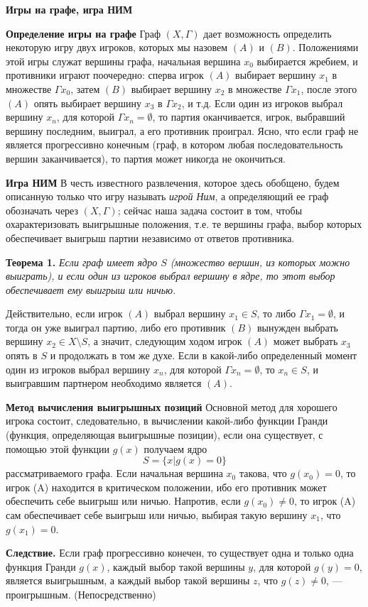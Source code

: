 \textbf{Игры на графе, игра НИМ}

\textbf{Определение игры на графе}
Граф $(X, \Gamma)$ дает возможность определить некоторую игру двух игроков, которых мы назовем $(A)$ и $(B)$. Положениями этой игры служат вершины графа, начальная вершина $x_0$ выбирается жребием, и противники играют поочередно: сперва игрок $(A)$ выбирает вершину $x_1$ в множестве $\Gamma x_0$, затем $(B)$ выбирает вершину $x_2$ в множестве $\Gamma x_1$, после этого $(A)$ опять выбирает вершину $x_3$ в $\Gamma x_2$, и т.д. Если один из игроков выбрал вершину $x_n$, для которой $\Gamma x_n = \emptyset$, то партия оканчивается, игрок, выбравший вершину последним, выиграл, а его противник проиграл. Ясно, что если граф не является прогрессивно конечным (граф, в котором любая последовательность вершин заканчивается), то партия может никогда не окончиться.

\textbf{Игра НИМ}
В честь известного развлечения, которое здесь обобщено, будем описанную только что игру называть \textit{игрой Ним}, а определяющий ее граф обозначать через $(X, \Gamma)$; сейчас наша задача состоит в том, чтобы охарактеризовать выигрышные положения, т.е. те вершины графа, выбор которых обеспечивает выигрыш партии независимо от ответов противника.

\textbf{Теорема 1.} \textit{Если граф имеет ядро $S$ (множество вершин, из которых можно выиграть), и если один из игроков выбрал вершину в ядре, то этот выбор обеспечивает ему выигрыш или ничью.}

Действительно, если игрок $(A)$ выбрал вершину $x_1 \in S$, то либо $\Gamma x_1 = \emptyset$, и тогда он уже выиграл партию, либо его противник $(B)$ вынужден выбрать вершину $x_2 \in X \setminus S$, а значит, следующим ходом игрок $(A)$ может выбрать $x_3$ опять в $S$ и продолжать в том же духе. Если в какой-либо определенный момент один из игроков выбрал вершину $x_n$, для которой $\Gamma x_n = \emptyset$, то $x_n \in S$, и выигравшим партнером необходимо является $(A)$.

\textbf{Метод вычисления выигрышных позиций}
Основной метод для хорошего игрока состоит, следовательно, в вычислении какой-либо функции Гранди (функция, определяющая выигрышные позиции), если она существует, с помощью этой функции \( g(x) \) получаем ядро
\[
S = \{ x | g(x) = 0 \}
\]
рассматриваемого графа. Если начальная вершина \( x_0 \) такова, что \( g(x_0) = 0 \), то игрок (A) находится в критическом положении, ибо его противник может обеспечить себе выигрыш или ничью. Напротив, если \( g(x_0) \neq 0 \), то игрок (A) сам обеспечивает себе выигрыш или ничью, выбирая такую вершину \( x_1 \), что \( g(x_1) = 0 \).

\textbf{Следствие.} Если граф прогрессивно конечен, то существует одна и только одна функция Гранди \( g(x) \), каждый выбор такой вершины \( y \), для которой \( g(y) = 0 \), является выигрышным, а каждый выбор такой вершины \( z \), что \( g(z) \neq 0 \), — проигрышным. (Непосредственно)
